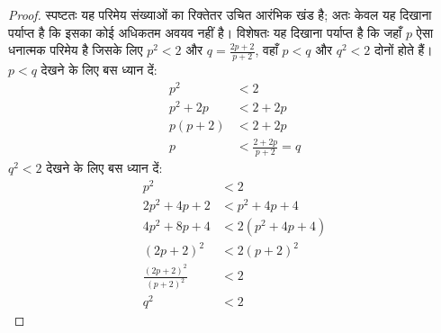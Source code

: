 \documentclass[../../../include/open-logic-section]{subfiles}
\begin{document}
\begin{proof}
स्पष्टतः यह परिमेय संख्याओं का रिक्तेतर उचित आरंभिक खंड है; अतः केवल यह दिखाना
पर्याप्त है कि इसका कोई अधिकतम अवयव नहीं है। विशेषतः यह दिखाना पर्याप्त है कि
जहाँ $p$ ऐसा धनात्मक परिमेय है जिसके लिए $p^2 < 2$ और $q =
\frac{2p+2}{p+2}$, वहाँ $p < q$ और $q^2 < 2$ दोनों होते हैं। $p < q$ देखने
के लिए बस ध्यान दें:
\begin{align*}
	p^2 &< 2\\
	p^2 + 2p &< 2 + 2p\\
	p(p + 2) &< 2 + 2p\\
	p &< \tfrac{2+2p}{p+2} = q
\end{align*}
$q^2 < 2$ देखने के लिए बस ध्यान दें:
\begin{align*}
	p^2 &< 2\\
	2p^2 + 4p + 2 &< p^2 + 4p+ 4\\
	4p^2 + 8p + 4 &< 2(p^2 + 4p + 4)\\
	(2p+2)^2 & <2(p+2)^2\\
	\tfrac{(2p+2)^2}{(p+2)^2} &< 2\\
	q^2 &< 2
\end{align*}
\end{proof}
\end{document}
